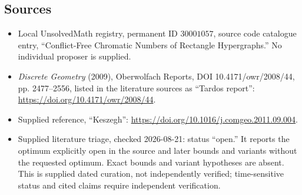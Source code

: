 \documentclass[11pt]{article}
\begin{document}
\subsection{Sources}
\begin{itemize}
\item Local UnsolvedMath registry, permanent ID \(30001057\), source code catalogue entry, ``Conflict-Free Chromatic Numbers of Rectangle Hypergraphs.'' No individual proposer is supplied.
\item \emph{Discrete Geometry} (2009), Oberwolfach Reports, DOI 10.4171/owr/2008/44, pp. 2477--2556, listed in the literature sources as ``Tardos report'': \url{https://doi.org/10.4171/owr/2008/44}.
\item Supplied reference, ``Keszegh'': \url{https://doi.org/10.1016/j.comgeo.2011.09.004}.
\item Supplied literature triage, checked 2026-08-21: status ``open.'' It reports the optimum explicitly open in the source and later bounds and variants without the requested optimum. Exact bounds and variant hypotheses are absent. This is supplied dated curation, not independently verified; time-sensitive status and cited claims require independent verification.
\end{itemize}
\end{document}
